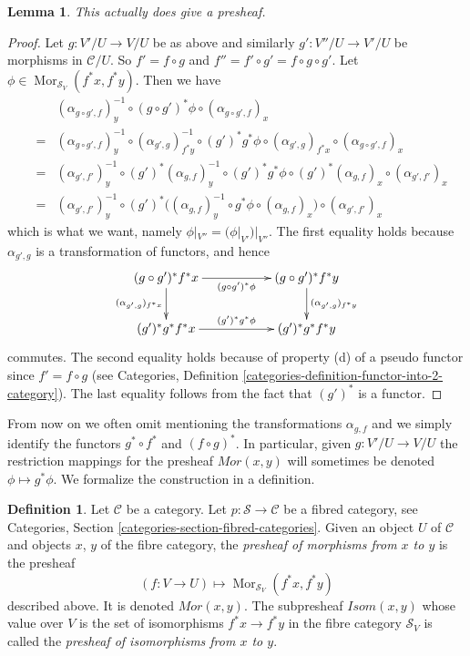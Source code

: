 \documentclass{stacks-project}
\theoremstyle{plain}
\newtheorem{lemma}[subsection]{Lemma}
\theoremstyle{definition}
\newtheorem{definition}[subsection]{Definition}
\theoremstyle{remark}
\numberwithin{equation}{subsection}
\def\Mor{\mathop{\mathrm{Mor}}\nolimits}
\begin{document}
\begin{lemma}
\label{lemma-painful}
This actually does give a presheaf.
\end{lemma}

\begin{proof}
Let $g : V'/U \to V/U$ be as above and similarly
$g' : V''/U \to V'/U$ be morphisms in $\mathcal{C}/U$.
So $f' = f \circ g$ and $f'' = f' \circ g' = f \circ g \circ g'$.
Let $\phi \in \Mor_{\mathcal{S}_V}(f^\ast x, f^\ast y)$.
Then we have
\begin{eqnarray*}
& &
(\alpha_{g \circ g', f})_y^{-1} \circ
(g \circ g')^\ast \phi \circ
(\alpha_{g \circ g', f})_x
\\
& = &
(\alpha_{g \circ g', f})_y^{-1} \circ
(\alpha_{g', g})_{f^*y}^{-1} \circ
(g')^*g^\ast \phi \circ
(\alpha_{g', g})_{f^*x} \circ
(\alpha_{g \circ g', f})_x
\\
& = &
(\alpha_{g', f'})_y^{-1} \circ
(g')^*(\alpha_{g, f})_y^{-1} \circ
(g')^* g^\ast \phi \circ
(g')^*(\alpha_{g, f})_x
\circ
(\alpha_{g', f'})_x
\\
& = &
(\alpha_{g', f'})_y^{-1} \circ
(g')^*\Big(
(\alpha_{g, f})_y^{-1} \circ
g^\ast \phi \circ
(\alpha_{g, f})_x
\Big) \circ
(\alpha_{g', f'})_x
\end{eqnarray*}
which is what we want, namely $\phi|_{V''} = (\phi|_{V'})|_{V''}$.
The first equality holds because
$\alpha_{g', g}$ is a transformation of functors, and hence
$$
\xymatrix{
(g \circ g')^*f^*x
\ar[rr]_{(g \circ g')^\ast \phi}
\ar[d]_{(\alpha_{g', g})_{f^*x}} & &
(g \circ g')^*f^*y
\ar[d]^{(\alpha_{g', g})_{f^*y}} \\
(g')^*g^*f^*x
\ar[rr]^{(g')^*g^\ast \phi} & &
(g')^*g^*f^*y
}
$$
commutes. The second equality holds because of property (d) of
a pseudo functor since $f' = f \circ g$ (see
Categories, Definition \ref{categories-definition-functor-into-2-category}).
The last equality follows from the fact that $(g')^*$ is a functor.
\end{proof}

\noindent
From now on we often omit mentioning the transformations
$\alpha_{g, f}$ and we simply identify the functors
$g^* \circ f^*$ and $(f \circ g)^*$. In particular,
given $g : V'/U \to V/U$ the restriction
mappings for the presheaf $\mathit{Mor}(x, y)$
will sometimes be denoted $\phi \mapsto g^*\phi$.
We formalize the construction in a definition.

\begin{definition}
\label{definition-mor-presheaf}
Let $\mathcal{C}$ be a category.
Let $p : \mathcal{S} \to \mathcal{C}$ be a fibred category,
see Categories, Section \ref{categories-section-fibred-categories}.
Given an object $U$ of $\mathcal{C}$ and objects
$x$, $y$ of the fibre category, the {\it presheaf
of morphisms from $x$ to $y$} is the presheaf
$$
(f : V \to U) \longmapsto \Mor_{\mathcal{S}_V}(f^*x, f^*y)
$$
described above. It is denoted $\mathit{Mor}(x, y)$.
The subpresheaf $\mathit{Isom}(x, y)$ whose value
over $V$ is the set of isomorphisms
$f^*x \to f^*y$ in the fibre category $\mathcal{S}_V$
is called the {\it presheaf of isomorphisms from $x$ to $y$}.
\end{definition}
\end{document}
